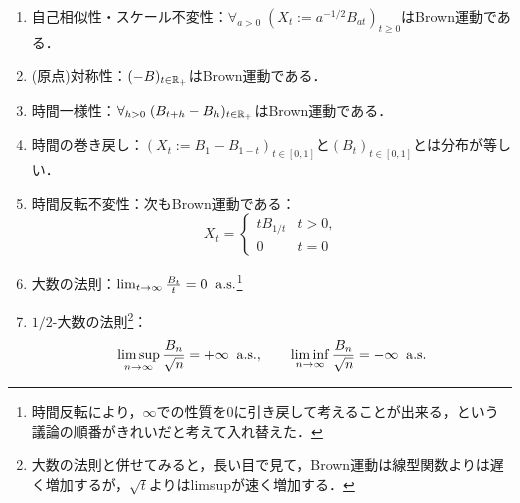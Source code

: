 \documentclass[uplatex,dvipdfmx]{jsreport}
\begin{document}
\begin{proposition}\mbox{}\label{prop-character-of-Brownian-motion-1}
    \begin{enumerate}
        \item 自己相似性・スケール不変性：$\forall_{a>0}\;(X_t:=a^{-1/2}B_{at})_{t\ge0}$はBrown運動である．
        \item (原点)対称性：$(-B)_{t\in\mathbb{R}_+}$はBrown運動である．
        \item 時間一様性：$\forall_{h>0}\;(B_{t+h}-B_h)_{t\in\mathbb{R}_+}$はBrown運動である．
        \item 時間の巻き戻し：$(X_t:=B_1-B_{1-t})_{t\in[0,1]}$と$(B_t)_{t\in[0,1]}$とは分布が等しい．
        \item 時間反転不変性：次もBrown運動である：
        \[X_t=\begin{cases}
            tB_{1/t}&t>0,\\0&t=0
        \end{cases}\]
        \item 大数の法則：$\lim_{t\to\infty}\frac{B_t}{t}=0\;\;\mathrm{a.s.}$\footnote{時間反転により，$\infty$での性質を$0$に引き戻して考えることが出来る，という議論の順番がきれいだと考えて入れ替えた．}        
        \item $1/2$-大数の法則\footnote{大数の法則と併せてみると，長い目で見て，Brown運動は線型関数よりは遅く増加するが，$\sqrt{t}$よりはlimsupが速く増加する．}：
        \[\limsup_{n\to\infty}\frac{B_n}{\sqrt{n}}=+\infty\;\;\mathrm{a.s.},\qquad\liminf_{n\to\infty}\frac{B_n}{\sqrt{n}}=-\infty\;\;\mathrm{a.s.}\]
    \end{enumerate}
\end{proposition}
\end{document}
